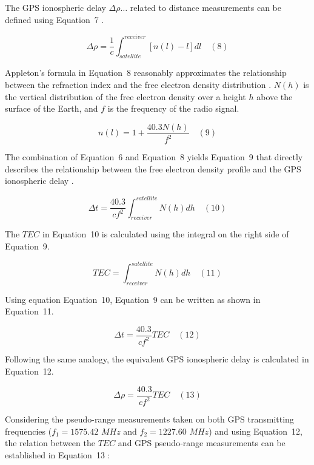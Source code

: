 \documentclass[sn-mathphys-num]{sn-jnl}%
\begin{document}
The GPS ionospheric delay $\Delta \rho \dots$ related to distance measurements can be defined using Equation~7 \cite{spilker1996global}.

\begin{equation}
	\Delta \rho = \frac{1}{c} \int_{satellite}^{receiver} \left[ n(l) - l \right]dl
	\quad\left(8\right)
\end{equation}

Appleton’s formula in Equation~8 reasonably approximates the relationship between the refraction index and the free electron density distribution \cite{davies1990ionospheric, spilker1996global}. $N(h)$ is the vertical distribution of the free electron density over a height $h$ above the surface of the Earth, and $f$ is the frequency of the radio signal.

\begin{equation}
	n(l) = 1 + \frac{40.3 N(h)}{f^{2}}
	\quad\left(9\right)
\end{equation}

The combination of Equation~6 and Equation~8 yields Equation~9 that directly describes the relationship between the free electron density profile and the GPS ionospheric delay \cite{spilker1996global}.

\begin{equation}
	\Delta t = \frac{40.3}{c f^{2}} \int_{receiver}^{satellite} N(h)dh
	\quad\left(10\right)
\end{equation}

The $TEC$ \cite{spilker1996global} in Equation~10 is calculated using the integral on the right side of Equation~9.

\begin{equation}
	TEC = \int_{receiver}^{satellite} N(h)dh
	\quad\left(11\right)
\end{equation}

Using equation Equation~10, Equation~9 can be written as shown in Equation~11.

\begin{equation}
	\Delta t = \frac{40.3}{c f^{2}} TEC
	\quad\left(12\right)
\end{equation}

Following the same analogy, the equivalent GPS ionospheric delay is calculated in Equation~12.

\begin{equation}
	\Delta \rho = \frac{40.3}{c f^{2}} TEC
	\quad\left(13\right)
\end{equation}

Considering the pseudo-range measurements taken on both GPS transmitting frequencies ($f_{1}=1575.42$ $MHz$ and $f_{2}=1227.60$ $MHz$) and using Equation~12, the relation between the $TEC$ and GPS pseudo-range measurements can be established in Equation~13 \cite{spilker1996global}:
 
\end{document}

